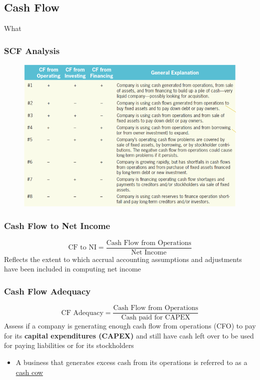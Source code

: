 \documentclass{article}
\begin{document}
\begin{multicols}{2}
\subsection{Cash Flow}
What

\subsubsection{SCF Analysis}
\begin{figure}[H]
	\centering
	\includegraphics[width=\columnwidth]{image/scf_analysis.png}
\end{figure}

\subsubsection{Cash Flow to Net Income}
$$\text{CF to NI} = \frac{\text{Cash Flow from Operations}}{\text{Net Income}}$$
Reflects the extent to which accrual accounting assumptions and adjustments have been included in computing net income

\subsubsection{Cash Flow Adequacy}
$$\text{CF Adequacy} = \frac{\text{Cash Flow from Operations}}{\text{Cash paid for CAPEX}}$$
Assess if a company is generating enough cash flow from operations (CFO) to pay for its \textbf{capital expenditures (CAPEX)} and still have cash left over to be used for paying liabilities or for its stockholders
\begin{itemize}
	\item A business that generates excess cash from its operations is referred to as a \underline{cash cow}
\end{itemize}





\end{multicols}
\end{document}
